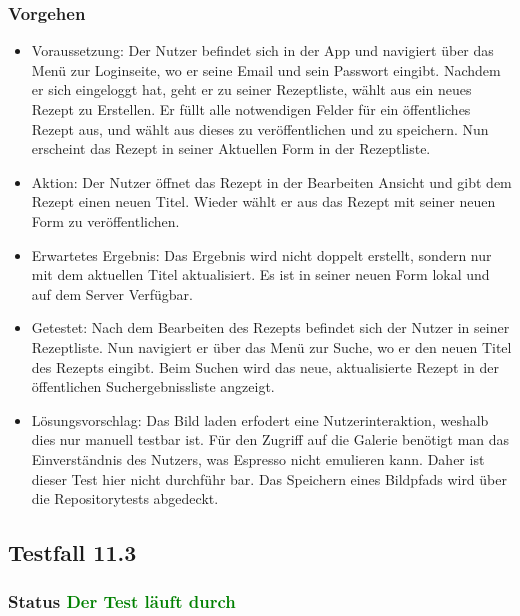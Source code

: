 \subsubsection{Vorgehen}
\begin{itemize}
\item Voraussetzung: Der Nutzer befindet sich in der App und navigiert über das Menü zur Loginseite, wo er seine Email und sein Passwort eingibt. Nachdem er sich eingeloggt hat, geht er zu seiner Rezeptliste, wählt aus ein neues Rezept zu Erstellen. Er füllt alle notwendigen Felder für ein öffentliches Rezept aus, und wählt aus dieses zu veröffentlichen und zu speichern. Nun erscheint das Rezept in seiner Aktuellen Form in der Rezeptliste.
\item Aktion: Der Nutzer öffnet das Rezept in der Bearbeiten Ansicht und gibt dem Rezept einen neuen Titel. Wieder wählt er aus das Rezept mit seiner neuen Form zu veröffentlichen. 
\item Erwartetes Ergebnis: Das Ergebnis wird nicht doppelt erstellt, sondern nur mit dem aktuellen Titel aktualisiert. Es ist in seiner neuen Form lokal und auf dem Server Verfügbar.
\item Getestet: Nach dem Bearbeiten des Rezepts befindet sich der Nutzer in seiner Rezeptliste. Nun navigiert er über das Menü zur Suche, wo er den neuen Titel des Rezepts eingibt. Beim Suchen wird das neue, aktualisierte Rezept in der öffentlichen Suchergebnissliste angzeigt. 
\item Lösungsvorschlag: Das Bild laden erfodert eine Nutzerinteraktion, weshalb dies nur manuell testbar ist. Für den Zugriff auf die Galerie benötigt man das Einverständnis des Nutzers, was Espresso nicht emulieren kann. Daher ist dieser Test hier nicht durchführ bar. Das Speichern eines Bildpfads wird über die Repositorytests abgedeckt. 
\end{itemize}

\subsection{Testfall 11.3}
\subsubsection{Status \textcolor{green}{ Der Test läuft durch} }
